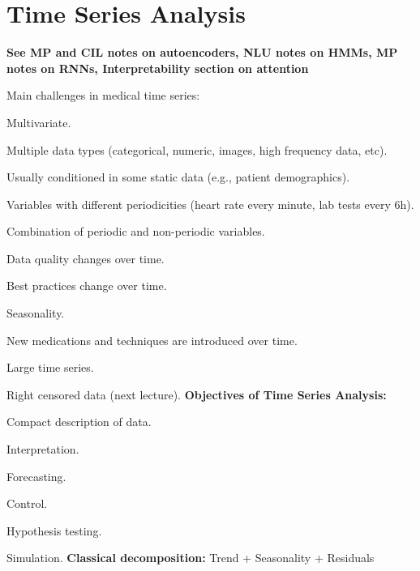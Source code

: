 \documentclass[12pt]{article}
\begin{document}
\section{Time Series Analysis}
\textbf{See MP and CIL notes on autoencoders, NLU notes on HMMs, MP notes on RNNs, Interpretability section on attention}
\par Main challenges in medical time series:
\ulb
\item Multivariate.
\item Multiple data types (categorical, numeric, images, high frequency data, etc).
\item Usually conditioned in some static data (e.g., patient demographics).
\item Variables with different periodicities (heart rate every minute, lab tests every 6h).
\item Combination of periodic and non-periodic variables.
\item Data quality changes over time.
\item Best practices change over time.
\item Seasonality.
\item New medications and techniques are introduced over time.
\item Large time series.
\item Right censored data (next lecture).
\ule
\mce
\textbf{Objectives of Time Series Analysis:}
\ulb
\item Compact description of data.
\item Interpretation.
\item Forecasting.
\item Control.
\item Hypothesis testing.
\item Simulation.
\ule
\textbf{Classical decomposition:} Trend + Seasonality + Residuals
\end{document}
